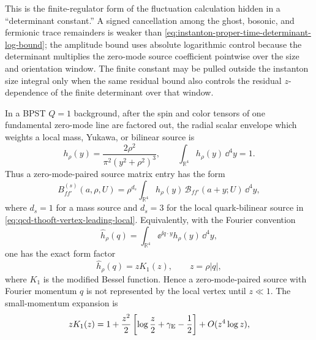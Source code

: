\begin{controlledapproximation}
This is the finite-regulator form of the fluctuation calculation hidden in a
``determinant constant.''  A signed cancellation among the ghost, bosonic,
and fermionic trace remainders is weaker than
\eqref{eq:instanton-proper-time-determinant-log-bound}; the amplitude bound
uses absolute logarithmic control because the determinant multiplies the
zero-mode source coefficient pointwise over the size and orientation window.
The finite constant may be pulled outside the instanton size integral only
when the same residual bound also controls the residual \(z\)-dependence of the
finite determinant over that window.
\end{controlledapproximation}

\begin{proposition}
\label{prop:instanton-zero-mode-tail-local-limit}
In a BPST \(Q=1\) background, after the spin and color tensors of one
fundamental zero-mode line are factored out, the radial scalar envelope which
weights a local mass, Yukawa, or bilinear source is
\begin{equation}
  h_\rho(y)
  =
  \frac{2\rho^2}{\pi^2(y^2+\rho^2)^3},
  \qquad
  \int_{\mathbb R^4}h_\rho(y)\,\dd^4y=1 .
  \label{eq:instanton-zero-mode-envelope}
\end{equation}
Thus a zero-mode-paired source matrix entry has the form
\begin{equation}
  B_{ff'}^{(s)}(a,\rho,U)
  =
  \rho^{d_s}
  \int_{\mathbb R^4}
  h_\rho(y)\,
  \mathcal B_{ff'}(a+y;U)\,\dd^4y ,
  \label{eq:instanton-zero-mode-source-convolution}
\end{equation}
where \(d_s=1\) for a mass source and \(d_s=3\) for the local quark-bilinear
source in \eqref{eq:qcd-thooft-vertex-leading-local}.  Equivalently, with
the Fourier convention
\[
  \widehat h_\rho(q)=
  \int_{\mathbb R^4}\ee^{\ii q\cdot y}h_\rho(y)\,\dd^4y ,
\]
one has the exact form factor
\begin{equation}
  \widehat h_\rho(q)
  =
  zK_1(z),
  \qquad z=\rho |q|,
  \label{eq:instanton-zero-mode-momentum-form-factor}
\end{equation}
where \(K_1\) is the modified Bessel function.  Hence a zero-mode-paired
source with Fourier momentum \(q\) is not represented by the local vertex
until \(z\ll1\).
The small-momentum expansion is
\begin{equation}
  zK_1(z)
  =
  1+
  \frac{z^2}{2}
  \left[
    \log\frac{z}{2}+\gamma_{\rm E}-\frac12
  \right]
  +O(z^4\log z),
  \label{eq:instanton-zero-mode-form-factor-small-momentum}

\end{equation}
\end{proposition}
